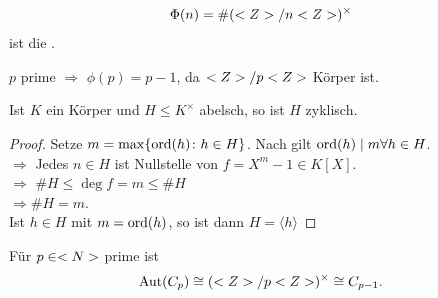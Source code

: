 \begin{definition}
	\begin{align}
		\Phi(n) = \#(<Z>/n<Z>)^\times\notag
	\end{align}
	ist die .
\end{definition}

\begin{example}
	$p$ prime $\Rightarrow$ $\phi(p) = p-1$, da $<Z> / p<Z>$ Körper ist.
\end{example}

\begin{proposition}
	Ist $K$ ein Körper und $H\leq K^{\times}$ abelsch, so ist $H$ zyklisch.
\end{proposition}

\begin{proof}
	Setze $m=\max\{\operatorname{ord}(h) \colon h \in H\}$. Nach  gilt $\operatorname{ord}(h) \mid m \forall h \in H$.\\
	$\Rightarrow$ Jedes $n \in H$ ist Nullstelle von $f = X^m -1 \in K[X]$.\\
	$\Rightarrow$ $\# H \leq \deg f = m \leq \# H$\\
	$\Rightarrow \# H = m$.\\
	Ist $h \in H$ mit $m = \operatorname{ord}(h)$, so ist dann $H = \langle h \rangle$ 
\end{proof}

\begin{conclusion}
	Für $p \in <N>$ prime ist
	\begin{align}
		\operatorname{Aut}(C_p) \cong (<Z> / p <Z>)^{\times} \cong C_{p-1}.\notag
	\end{align}
\end{conclusion}